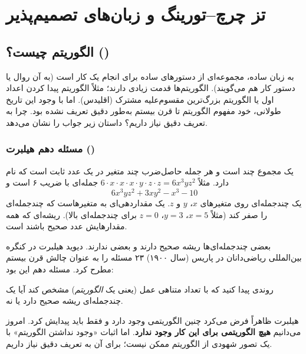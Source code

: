 \chapter{تز چرچ–تورینگ و زبان‌های تصمیم‌پذیر}

\section{الگوریتم چیست؟ ()}

به زبان ساده،  مجموعه‌ای از دستورهای ساده برای انجام یک کار است (به آن روال یا دستور کار هم می‌گویند). الگوریتم‌ها قدمت زیادی دارند؛ مثلاً الگوریتم پیدا کردن اعداد اول یا الگوریتم بزرگ‌ترین مقسوم‌علیه مشترک (اقلیدس). اما با وجود این تاریخ طولانی، خود مفهوم الگوریتم تا قرن بیستم به‌طور دقیق تعریف نشده بود. چرا به تعریف دقیق نیاز داریم؟ داستان زیر جواب را نشان می‌دهد.

\subsection{مسئله دهم هیلبرت ()}

\begin{definition}
یک  مجموع چند  است و هر جمله حاصل‌ضرب چند متغیر در یک عدد ثابت است که  نام دارد. مثلاً $6\cdot x\cdot x\cdot x\cdot y\cdot z\cdot z=6x^3yz^2$ جمله‌ای با ضریب ۶ است و
\[6x^3yz^2+3xy^2-x^3-10\]
یک چندجمله‌ای روی متغیرهای $x$، $y$ و $z$. یک  مقداردهی‌ای به متغیرهاست که چندجمله‌ای را صفر کند (مثلاً $x=5$، $y=3$، $z=0$ برای چندجمله‌ای بالا). ریشه‌ای که همه مقدارهایش عدد صحیح باشند  است.
\end{definition}

بعضی چندجمله‌ای‌ها ریشه صحیح دارند و بعضی ندارند. دیوید هیلبرت در کنگره بین‌المللی ریاضی‌دانان در پاریس (سال ۱۹۰۰) ۲۳ مسئله را به عنوان چالش قرن بیستم مطرح کرد. مسئله دهم این بود:

\begin{note}
روندی پیدا کنید که با تعداد متناهی عمل (یعنی یک \emph{الگوریتم}) مشخص کند آیا یک چندجمله‌ای ریشه صحیح دارد یا نه.
\end{note}

هیلبرت ظاهراً فرض می‌کرد چنین الگوریتمی وجود دارد و فقط باید پیدایش کرد. امروز می‌دانیم \textbf{هیچ الگوریتمی برای این کار وجود ندارد}. اما اثبات «وجود نداشتن الگوریتم» با یک تصور شهودی از الگوریتم ممکن نیست؛ برای آن به تعریف دقیق نیاز داریم.

